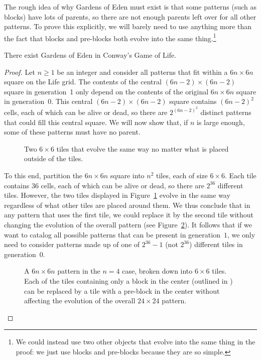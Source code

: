 The rough idea of why Gardens of Eden must exist is that some patterns (such as blocks) have lots of parents, so there are not enough parents left over for all other patterns. To prove this explicitly, we will barely need to use anything more than the fact that blocks and pre-blocks both evolve into the same thing.\footnote{We could instead use two other objects that evolve into the same thing in the proof: we just use blocks and pre-blocks because they are so simple.}	

\begin{theorem}\label{thm:garden_of_eden_exists}
	There exist Gardens of Eden in Conway's Game of Life.
\end{theorem}

\begin{proof}
	Let $n \geq 1$ be an integer and consider all patterns that fit within a $6n \times 6n$ square on the Life grid. The contents of the central $(6n-2) \times (6n-2)$ square in generation~1 only depend on the contents of the original $6n \times 6n$ square in generation~0. This central $(6n-2) \times (6n-2)$ square contains $(6n-2)^2$ cells, each of which can be alive or dead, so there are $2^{(6n-2)^2}$ distinct patterns that could fill this central square. We will now show that, if $n$ is large enough, some of these patterns must have no parent.
	
	\begin{figure}[!htb]
		\centering{}
		\caption{Two $6 \times 6$ tiles that evolve the same way no matter what is placed outside of the tiles.}\label{fig:goe_theorem_tiles}
	\end{figure}
		
	To this end, partition the $6n \times 6n$ square into $n^2$ tiles, each of size $6 \times 6$. Each tile contains $36$ cells, each of which can be alive or dead, so there are $2^{36}$ different tiles. However, the two tiles displayed in Figure~\ref{fig:goe_theorem_tiles} evolve in the same way regardless of what other tiles are placed around them. We thus conclude that in any pattern that uses the first tile, we could replace it by the second tile without changing the evolution of the overall pattern (see Figure~\ref{fig:goe_theorem_tiles_example}). It follows that if we want to catalog all possible patterns that can be present in generation~$1$, we only need to consider patterns made up of one of $2^{36} - 1$ (not $2^{36}$) different tiles in generation~$0$.
	
	\begin{figure}[!htb]
		\centering{}
		\caption{A $6n \times 6n$ pattern in the $n = 4$ case, broken down into $6 \times 6$ tiles. Each of the tiles containing only a block in the center (outlined in ) can be replaced by a tile with a pre-block in the center without affecting the evolution of the overall $24 \times 24$ pattern.}\label{fig:goe_theorem_tiles_example}
	\end{figure}
	

\end{proof}

